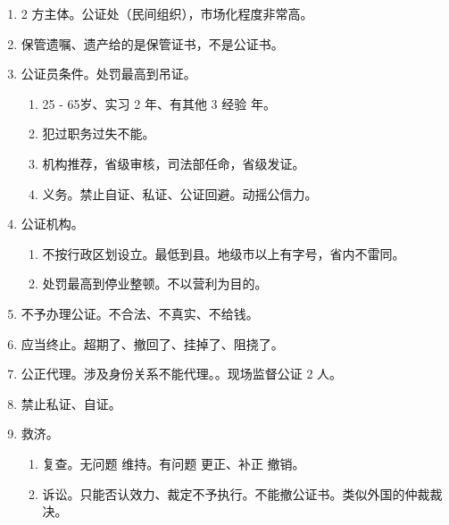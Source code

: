 \begin{enumerate}
\begin{enumerate}
          \item 2 方主体。公证处（民间组织），市场化程度非常高。
          \item 保管遗嘱、遗产给的是保管证书，不是公证书。
          \item 公证员条件。处罚最高到吊证。
                \begin{enumerate}
                  \item 25 - 65岁、实习 2 年、有其他 3 经验  年。
                  \item 犯过职务过失不能。
                  \item 机构推荐，省级审核，司法部任命，省级发证。
                  \item 义务。禁止自证、私证、公证回避。动摇公信力。
                \end{enumerate}
          \item 公证机构。
                \begin{enumerate}
                  \item 不按行政区划设立。最低到县。地级市以上有字号，省内不雷同。
                  \item 处罚最高到停业整顿。不以营利为目的。
                \end{enumerate}
          \item 不予办理公证。不合法、不真实、不给钱。
          \item 应当终止。超期了、撤回了、挂掉了、阻挠了。
          \item 公正代理。\yi 涉及身份关系不能代理。。\er 现场监督公证 2 人。
          \item 禁止私证、自证。
          \item 救济。
                \begin{enumerate}
                  \item 复查。无问题 \yjt 维持。有问题 \yjt 更正、补正 \hz 撤销。
                  \item 诉讼。只能否认效力、裁定不予执行。不能撤公证书。类似外国的仲裁裁决。
                \end{enumerate}
        \end{enumerate}
\end{enumerate}
